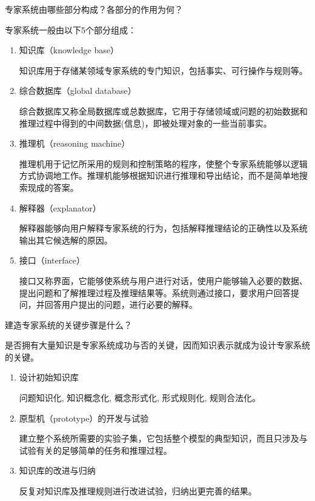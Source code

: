 \begin{question}
专家系统由哪些部分构成？各部分的作用为何？
\end{question}
\begin{solution}
专家系统一般由以下5个部分组成：
	\begin{enumerate}
		\item 知识库（knowledge base）\par
		知识库用于存储某领域专家系统的专门知识，包括事实、可行操作与规则等。 
		\item 综合数据库（global database）\par
		综合数据库又称全局数据库或总数据库，它用于存储领域或问题的初始数据和推理过程中得到的中间数据(信息)，即被处理对象的一些当前事实。  
		\item 推理机（reasoning machine）\par
		推理机用于记忆所采用的规则和控制策略的程序，使整个专家系统能够以逻辑方式协调地工作。推理机能够根据知识进行推理和导出结论，而不是简单地搜索现成的答案。
		\item 解释器（explanator）\par
		解释器能够向用户解释专家系统的行为，包括解释推理结论的正确性以及系统输出其它候选解的原因。 
		\item 接口（interface）\par
		接口又称界面，它能够使系统与用户进行对话，使用户能够输入必要的数据、提出问题和了解推理过程及推理结果等。系统则通过接口，要求用户回答提问，并回答用户提出的问题，进行必要的解释。
	\end{enumerate}
\end{solution}

\begin{question}
建造专家系统的关键步骤是什么？
\end{question}
\begin{solution}
是否拥有大量知识是专家系统成功与否的关键，因而知识表示就成为设计专家系统的关键。
	\begin{enumerate}
		\item 设计初始知识库 \par
		问题知识化, 知识概念化, 概念形式化, 形式规则化, 规则合法化。
		\item 原型机（prototype）的开发与试验 \par
		建立整个系统所需要的实验子集，它包括整个模型的典型知识，而且只涉及与试验有关的足够简单的任务和推理过程。
		\item 知识库的改进与归纳 \par
		反复对知识库及推理规则进行改进试验，归纳出更完善的结果。
	\end{enumerate}
\end{solution}

